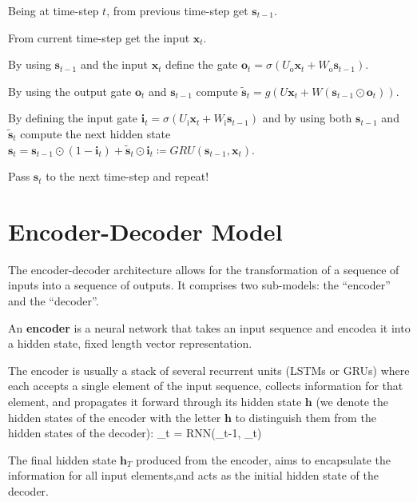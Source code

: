 \ben
\item Being at time-step $t$, from previous time-step get $\boldsymbol{s}_{t-1}$.
\item From current time-step get the input $\boldsymbol{x}_{t}$.
\item By using $\boldsymbol{s}_{t-1}$ and the input $\boldsymbol{x}_{t}$ define the gate $\boldsymbol{o}_{t} = \sigma
(U_{\text{o}} \boldsymbol{x}_{t} + W_{\text{o}} \boldsymbol{s}_{t-1})$.
\item By using the output gate $\boldsymbol{o}_{t}$ and $\boldsymbol{s}_{t-1}$ compute $\boldsymbol{\tilde{s}}_t = g
(U\boldsymbol{x}_{t} + W (\boldsymbol{s}_{t-1} \odot \boldsymbol{o}_{t}))$.
\item By defining the input gate $\boldsymbol{i}_{t} = \sigma(U_{\text{i}} \boldsymbol{x}_{t} + W_{\text{i}}
\boldsymbol{s}_{t-1})$ and by using both $\boldsymbol{s}_{t-1}$ and $\boldsymbol{\tilde{s}}_t $ compute the next
hidden state $\boldsymbol{s}_{t} = \boldsymbol{s}_{t-1} \odot (1 - \boldsymbol{i}_{t}) + \boldsymbol{\tilde{s}}_t
\odot \boldsymbol{i}_{t} \coloneqq GRU(\boldsymbol{s}_{t-1}, \boldsymbol{x}_{t}) $.
\item Pass $\boldsymbol{s}_{t}$ to the next time-step and repeat!
\een

\section{Encoder-Decoder Model}

The encoder-decoder architecture allows for the transformation of a sequence of inputs into a sequence of outputs.
It comprises two sub-models: the ``encoder'' and the ``decoder''.

\bd[Encoder]
An \textbf{encoder} is a neural network that takes an input sequence and encodea it into a hidden state, fixed length
vector representation.
\ed

The encoder is usually a stack of several recurrent units (LSTMs or GRUs) where each accepts a single element of the
input sequence, collects information for that element, and propagates it forward through its hidden state
$\boldsymbol{h}$ (we denote the hidden states of the encoder with the letter $\boldsymbol{h}$ to distinguish them from
the hidden states of the decoder):
\bse
{}_{t} = RNN(_{t-1}, _{t})
\ese

The final hidden state $\boldsymbol{h}_T$ produced from the encoder, aims to encapsulate the information for all input
elements,and acts as the initial hidden state of the decoder.

